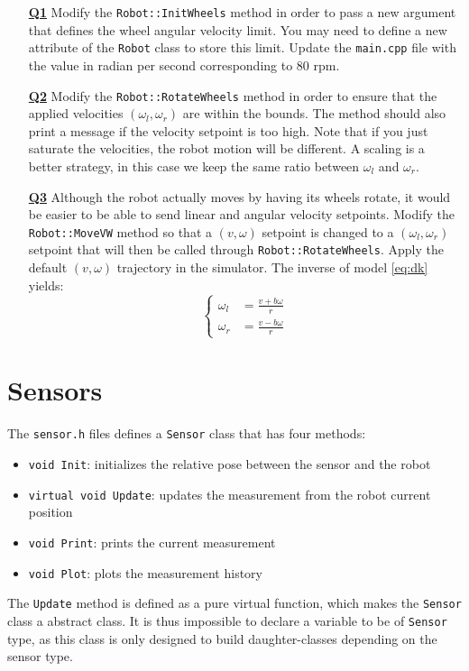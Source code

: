 \documentclass{ecnreport}
\begin{document}
\begin{itemize}
\medskip\item[\textbf{\underline{Q1}}] Modify the \texttt{Robot::InitWheels} method in order to pass a new argument that defines the wheel angular velocity limit. You may need to define a new attribute of the \texttt{Robot} class to store this limit. Update the \texttt{main.cpp} file with the value in radian per second corresponding to 80 rpm.

\medskip\item[\textbf{\underline{Q2}}] Modify the \texttt{Robot::RotateWheels} method in order to ensure that the applied velocities $(\omega_l, \omega_r)$ are within the bounds.
The method should also print a message if the velocity setpoint is too high.
Note that if you just saturate the velocities, the robot motion will be different. A scaling is a better strategy, in this case we keep the same ratio between $\omega_l$ and $\omega_r$.

\medskip\item[\textbf{\underline{Q3}}] Although the robot actually moves by having its wheels rotate, it would be easier to be able to send linear and angular velocity setpoints. Modify the 
\texttt{Robot::MoveVW} method so that a $(v,\omega)$ setpoint is changed to a $(\omega_l,\omega_r)$ setpoint that will then be called through \texttt{Robot::RotateWheels}. Apply the default $(v,\omega)$ trajectory in the simulator. The inverse of model \eqref{eq:dk} yields:
\begin{equation}
\left\{\begin{array}{ll}
\omega_l &= \displaystyle \frac{v + b\omega}{r} \\
\omega_r &= \displaystyle \frac{v - b\omega}{r}
\end{array}\right.
\end{equation} 

\end{itemize}


\section{Sensors}

The \texttt{sensor.h} files defines a \texttt{Sensor} class that has four methods:
\begin{itemize}
\item \texttt{void Init}: initializes the relative pose between the sensor and the robot
\item \texttt{virtual void Update}: updates the measurement from the robot current position
\item \texttt{void Print}: prints the current measurement
\item \texttt{void Plot}: plots the measurement history       
\end{itemize}
The \texttt{Update} method is defined as a pure virtual function, which makes the \texttt{Sensor} class a abstract class. It is thus impossible to declare a variable to be of \texttt{Sensor} type, as this class is only designed to build daughter-classes depending on the sensor type.
\end{document}
